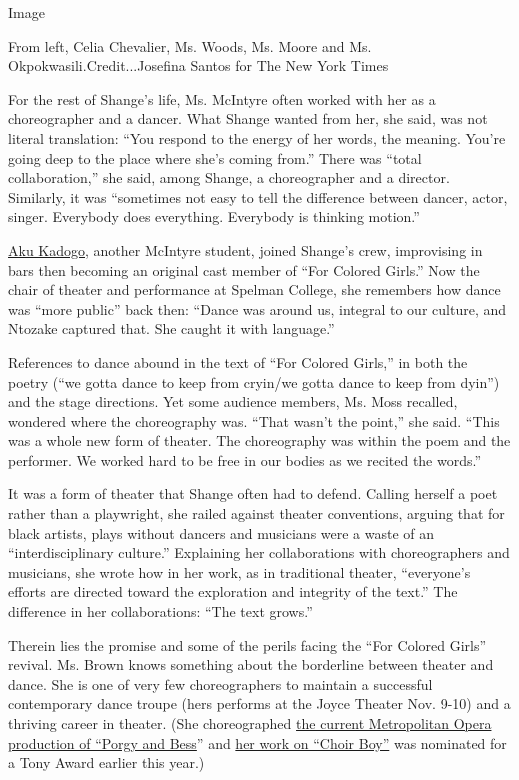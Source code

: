 Image

From left, Celia Chevalier, Ms. Woods, Ms. Moore and Ms.
Okpokwasili.Credit...Josefina Santos for The New York Times

For the rest of Shange's life, Ms. McIntyre often worked with her as a
choreographer and a dancer. What Shange wanted from her, she said, was
not literal translation: ``You respond to the energy of her words, the
meaning. You're going deep to the place where she's coming from.'' There
was ``total collaboration,'' she said, among Shange, a choreographer and
a director. Similarly, it was ``sometimes not easy to tell the
difference between dancer, actor, singer. Everybody does everything.
Everybody is thinking motion.''

\href{http://www.akukadogo.com/}{Aku Kadogo}, another McIntyre student,
joined Shange's crew, improvising in bars then becoming an original cast
member of ``For Colored Girls.'' Now the chair of theater and
performance at Spelman College, she remembers how dance was ``more
public'' back then: ``Dance was around us, integral to our culture, and
Ntozake captured that. She caught it with language.''

References to dance abound in the text of ``For Colored Girls,'' in both
the poetry (``we gotta dance to keep from cryin/we gotta dance to keep
from dyin'') and the stage directions. Yet some audience members, Ms.
Moss recalled, wondered where the choreography was. ``That wasn't the
point,'' she said. ``This was a whole new form of theater. The
choreography was within the poem and the performer. We worked hard to be
free in our bodies as we recited the words.''

It was a form of theater that Shange often had to defend. Calling
herself a poet rather than a playwright, she railed against theater
conventions, arguing that for black artists, plays without dancers and
musicians were a waste of an ``interdisciplinary culture.'' Explaining
her collaborations with choreographers and musicians, she wrote how in
her work, as in traditional theater, ``everyone's efforts are directed
toward the exploration and integrity of the text.'' The difference in
her collaborations: ``The text grows.''

Therein lies the promise and some of the perils facing the ``For Colored
Girls'' revival. Ms. Brown knows something about the borderline between
theater and dance. She is one of very few choreographers to maintain a
successful contemporary dance troupe (hers performs at the Joyce Theater
Nov. 9-10) and a thriving career in theater. (She choreographed
\href{https://www.youtube.com/watch?v=35lO5Bu-UOE}{the current
Metropolitan Opera production of ``Porgy and Bess}'' and
\href{https://www.nytimes3xbfgragh.onion/2019/02/13/arts/dance/speaking-in-dance-choir-boy.html?rref=collection\%2Fcolumn\%2Fspeakingindance\&action=click\&contentCollection=dance\&region=stream\&module=stream_unit\&version=latest\&contentPlacement=24\&pgtype=collection}{her
work on ``Choir Boy''} was nominated for a Tony Award earlier this
year.)

